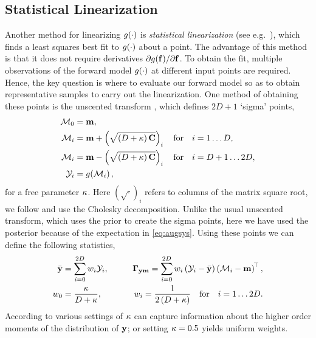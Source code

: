\documentclass{article} %
\begin{document}
\subsection{Statistical Linearization}

Another method for linearizing $g\!\left({{\cdot}}\right)$ is \emph{statistical
    linearization} (see e.g.~\cite{Geist2010}), which finds a least squares
best fit to $g\!\left({{\cdot}}\right)$ about a point. The advantage of this method is
that it does not require derivatives
$\partial g\!\left({{\mathbf{f}}}\right)\!/\partial\mathbf{f}$. To obtain the fit, multiple
observations of the forward model $g\!\left({{\cdot}}\right)$ at different input points
are required. Hence, the key question is where to evaluate our forward model so
as to obtain representative samples to carry out the linearization.  One method
of obtaining these points is the unscented transform \cite{Julier2004}, which
defines $2D+1$ `sigma' points,
\begin{align}
    \mathcal{M}_0 &= \mathbf{m},
        \label{eq:spoint0} \\
    \mathcal{M}_i &= \mathbf{m} + \left({\sqrt{\left({D + \kappa}\right) \mathbf{C}}}\right)_i \quad
        \text{for} \quad i = 1 \ldots D, \\
    \mathcal{M}_i &= \mathbf{m} - \left({\sqrt{\left({D + \kappa}\right) \mathbf{C}}}\right)_i \quad
        \text{for} \quad i = D+1 \ldots 2D,
        \label{eq:spointi} \\
    \mathcal{Y}_i &= g\!\left({{\mathcal{M}_i}}\right) \text{,}
\end{align}
for a free parameter $\kappa$. 
Here $(\sqrt{\cdot})_i$ refers to columns of the matrix square root, we follow
\cite{Julier2004} and use the Cholesky decomposition. Unlike the usual
unscented transform, which uses the prior to create the sigma points, here we
have used the posterior because of the expectation in \eqref{eq:augsys}. Using
these points we can define the following statistics,
\begin{alignat}{2}
    \bar{\mathbf{y}} &= \sum^{2D}_{i=0} w_i \mathcal{Y}_i,
    \qquad
    &\boldsymbol\Gamma_{\mathbf{y}\mathbf{m}} = \sum^{2D}_{i=0} w_i \left({\mathcal{Y}_i - \bar{\mathbf{y}}}\right)
        \left({\mathcal{M}_i - \mathbf{m}}\right)^{\!\top},
    \label{eq:slstats} \\
    w_0 &= \frac{\kappa}{D + \kappa},
        &w_i = \frac{1}{2\left({D + \kappa}\right)}
        \quad \text{for} \quad i = 1 \ldots 2D \text{.}
    \label{eq:slweights}
\end{alignat}
According to \cite{Julier2004} various settings
of $\kappa$ can capture information about the higher order moments of the
distribution of $\mathbf{y}$; or setting $\kappa = 0.5$ yields uniform weights.
\end{document}
